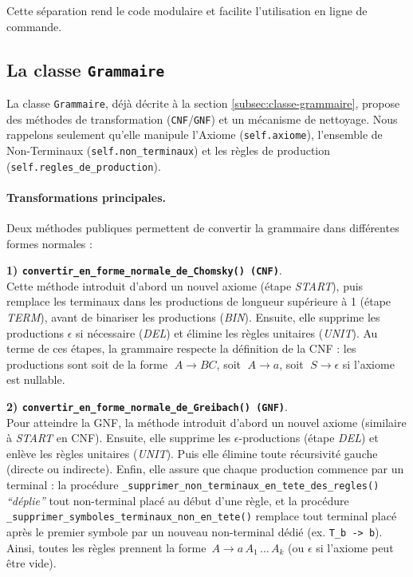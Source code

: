 \documentclass[a4paper,12pt]{article}
\begin{document}
\noindent
Cette séparation rend le code modulaire et facilite l’utilisation en ligne de commande.

\subsection{La classe \texttt{Grammaire}}
\label{subsec:classe-grammaire-detail}

La classe \texttt{Grammaire}, déjà décrite à la section \ref{subsec:classe-grammaire}, propose des méthodes de transformation (\texttt{CNF}/\texttt{GNF}) et un mécanisme de nettoyage. Nous rappelons seulement qu’elle manipule l’Axiome (\texttt{self.axiome}), l’ensemble de Non-Terminaux (\texttt{self.non\_terminaux}) et les règles de production (\texttt{self.regles\_de\_production}). 

\paragraph{Transformations principales.}
Deux méthodes publiques permettent de convertir la grammaire dans différentes formes normales :

\medskip

\textbf{1) \texttt{convertir\_en\_forme\_normale\_de\_Chomsky() (CNF)}}.\\
Cette méthode introduit d’abord un nouvel axiome (étape \emph{START}), puis remplace les terminaux dans les productions de longueur supérieure à 1 (étape \emph{TERM}), avant de binariser les productions (\emph{BIN}). Ensuite, elle supprime les productions \(\epsilon\) si nécessaire (\emph{DEL}) et élimine les règles unitaires (\emph{UNIT}). Au terme de ces étapes, la grammaire respecte la définition de la CNF : les productions sont soit de la forme \(\;A \to BC\), soit \(\;A \to a\), soit \(\;S \to \epsilon\) si l’axiome est nullable.

\bigskip

\textbf{2) \texttt{convertir\_en\_forme\_normale\_de\_Greibach() (GNF)}}.\\
Pour atteindre la GNF, la méthode introduit d'abord un nouvel axiome (similaire à \emph{START} en CNF). Ensuite, elle supprime les \(\epsilon\)-productions (étape \emph{DEL}) et enlève les règles unitaires (\emph{UNIT}). Puis elle élimine toute récursivité gauche (directe ou indirecte). Enfin, elle assure que chaque production commence par un terminal : la procédure  \texttt{\_supprimer\allowbreak\_non\allowbreak\_terminaux\allowbreak\_en\allowbreak\_tete\allowbreak\_des\allowbreak\_regles()} \emph{“déplie”} tout non-terminal placé au début d’une règle, et la procédure \texttt{\_supprimer\_symboles\_terminaux\_non\_en\_tete()} remplace tout terminal placé après le premier symbole par un nouveau non-terminal dédié (ex. \texttt{T\_b -> b}). Ainsi, toutes les règles prennent la forme \(\,A \to a\,A_1\,\dots\,A_k\) (ou \(\epsilon\) si l’axiome peut être vide).
\end{document}
